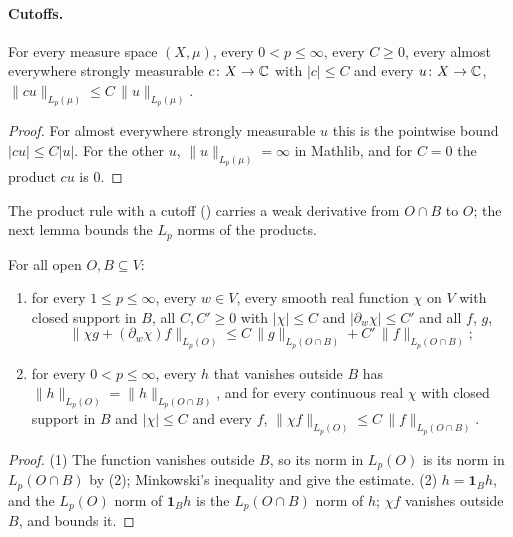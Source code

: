 \paragraph{Cutoffs.}

\begin{lemma}
\label{lem:bounded-multiplier-lp}
\leanok
For every measure space $(X, \mu)$, every $0 < p \leq \infty$, every $C \geq 0$, every almost
everywhere strongly measurable $c \colon X \to \mathbb{C}$ with $|c| \leq C$ and every $u \colon X \to \mathbb{C}$,
$\|c u\|_{L_p(\mu)} \leq C \, \|u\|_{L_p(\mu)}$.
\end{lemma}

\begin{proof}
\leanok
For almost everywhere strongly measurable $u$ this is the pointwise bound $|c u| \leq C |u|$.
For the other $u$, $\|u\|_{L_p(\mu)} = \infty$ in Mathlib, and for $C = 0$ the product $c u$ is
$0$.
\end{proof}

The product rule with a cutoff () carries a weak
derivative from $O \cap B$ to $O$; the next lemma bounds the $L_p$ norms of the products.

\begin{lemma}[Cutoffs in $L_p$]
\label{lem:weak-derivative-cutoff}
\leanok
{}
For all open $O, B \subseteq V$:
\begin{enumerate}
  \item for every $1 \leq p \leq \infty$, every $w \in V$, every smooth real function $\chi$ on
    $V$ with closed support in $B$, all $C, C' \geq 0$ with $|\chi| \leq C$ and
    $|\partial_w \chi| \leq C'$ and all $f$, $g$,
    \[
      \|\chi g + (\partial_w \chi) f\|_{L_p(O)} \leq C \, \|g\|_{L_p(O \cap B)}
        + C' \, \|f\|_{L_p(O \cap B)} ;
    \]
  \item for every $0 < p \leq \infty$, every $h$ that vanishes outside $B$ has
    $\|h\|_{L_p(O)} = \|h\|_{L_p(O \cap B)}$, and for every continuous real $\chi$ with closed
    support in $B$ and $|\chi| \leq C$ and every $f$,
    $\|\chi f\|_{L_p(O)} \leq C \, \|f\|_{L_p(O \cap B)}$.
\end{enumerate}
\end{lemma}

\begin{proof}
\leanok
(1) The function vanishes outside $B$, so its norm in $L_p(O)$ is its norm in $L_p(O \cap B)$ by
(2); Minkowski's inequality and  give the estimate. (2)
$h = \mathbf 1_B h$, and the $L_p(O)$ norm of $\mathbf 1_B h$ is the $L_p(O \cap B)$ norm of $h$;
$\chi f$ vanishes outside $B$, and  bounds it.
\end{proof}

